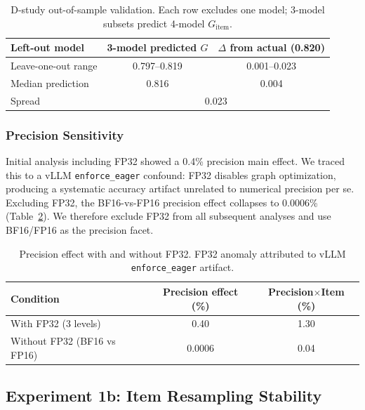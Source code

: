 \documentclass[11pt,letterpaper]{article}
\begin{document}
\begin{table}[t]
\centering
\caption{D-study out-of-sample validation. Each row excludes one model; 3-model subsets predict 4-model $G_{\text{item}}$.}
\label{tab:dstudy_validation}
\small
\begin{tabular}{lcc}
\toprule
\textbf{Left-out model} & \textbf{3-model predicted $G$} & \textbf{$\Delta$ from actual (0.820)} \\
\midrule
Leave-one-out range & 0.797--0.819 & 0.001--0.023 \\
Median prediction & 0.816 & 0.004 \\
\midrule
Spread & \multicolumn{2}{c}{0.023} \\
\bottomrule
\end{tabular}
\end{table}

\subsubsection{Precision Sensitivity}
\label{sec:precision}

Initial analysis including FP32 showed a 0.4\% precision main effect. We traced this to a vLLM \texttt{enforce\_eager} confound: FP32 disables graph optimization, producing a systematic accuracy artifact unrelated to numerical precision per se. Excluding FP32, the BF16-vs-FP16 precision effect collapses to 0.0006\% (Table~\ref{tab:precision}). We therefore exclude FP32 from all subsequent analyses and use BF16/FP16 as the precision facet.

\begin{table}[t]
\centering
\caption{Precision effect with and without FP32. FP32 anomaly attributed to vLLM \texttt{enforce\_eager} artifact.}
\label{tab:precision}
\small
\begin{tabular}{lcc}
\toprule
\textbf{Condition} & \textbf{Precision effect (\%)} & \textbf{Precision$\times$Item (\%)} \\
\midrule
With FP32 (3 levels) & 0.40 & 1.30 \\
Without FP32 (BF16 vs FP16) & 0.0006 & 0.04 \\
\bottomrule
\end{tabular}
\end{table}

\subsection{Experiment 1b: Item Resampling Stability}
\end{document}
